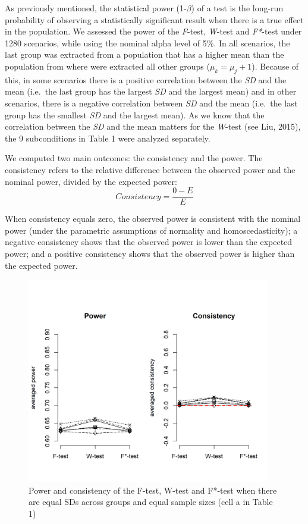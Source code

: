 \documentclass[man,floatsintext]{apa6}
\begin{document}
As previously mentioned, the statistical power (1-\(\beta\)) of a test is the long-run probability of observing a statistically significant result when there is a true effect in the population. We assessed the power of the \emph{F}-test, \emph{W}-test and \emph{F*}-test under 1280 scenarios, while using the nominal alpha level of 5\%. In all scenarios, the last group was extracted from a population that has a higher mean than the population from where were extracted all other groups (\(\mu_k = \mu_j+1\)). Because of this, in some scenarios there is a positive correlation between the \emph{SD} and the mean (i.e.~the last group has the largest \emph{SD} and the largest mean) and in other scenarios, there is a negative correlation between \emph{SD} and the mean (i.e.~the last group has the smallest \emph{SD} and the largest mean). As we know that the correlation between the \emph{SD} and the mean matters for the \emph{W}-test (see Liu, 2015), the 9 subconditions in Table 1 were analyzed separately.

We computed two main outcomes: the consistency and the power. The consistency refers to the relative difference between the observed power and the nominal power, divided by the expected power:
\begin{equation} 
Consistency=\frac{0-E}{E}
\label{eq:RDPWtest}
\end{equation}

When consistency equals zero, the observed power is consistent with the nominal power (under the parametric assumptions of normality and homoscedasticity); a negative consistency shows that the observed power is lower than the expected power; and a positive consistency shows that the observed power is higher than the expected power.

\begin{figure}
\includegraphics[width=400px]{Rmarkdown folder/Rmarkdown inputs/Fig2a} \caption{Power and consistency of the F-test, W-test and F*-test when there are equal SDs across groups and equal sample sizes (cell a in Table 1)}\label{fig:unnamed-chunk-6}
\end{figure}
\end{document}
